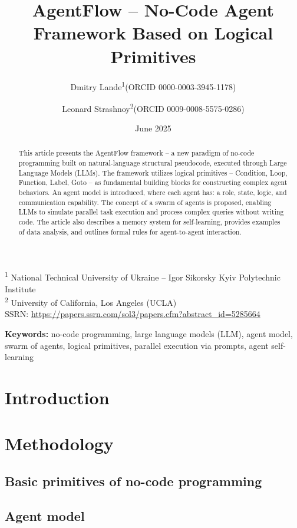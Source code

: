 \documentclass[11pt]{article}
\title{AgentFlow -- No-Code Agent Framework Based on Logical Primitives}
\author{
  Dmitry Lande\textsuperscript{1}(ORCID 0000-0003-3945-1178)
  \and
  Leonard Strashnoy\textsuperscript{2}(ORCID 0009-0008-5575-0286)
}
\date{June 2025}
\begin{document}
\maketitle

\begin{center}
{\small
\textsuperscript{1} National Technical University of Ukraine -- Igor Sikorsky Kyiv Polytechnic Institute\\
\textsuperscript{2} University of California, Los Angeles (UCLA)\\[0.5em]
SSRN: \url{https://papers.ssrn.com/sol3/papers.cfm?abstract_id=5285664}
}
\end{center}

\begin{abstract}
This article presents the AgentFlow framework -- a new paradigm of no-code
programming built on natural-language structural pseudocode, executed through Large Language
Models (LLMs). The framework utilizes logical primitives -- Condition, Loop, Function, Label,
Goto -- as fundamental building blocks for constructing complex agent behaviors. An agent
model is introduced, where each agent has: a role, state, logic, and communication capability.
The concept of a swarm of agents is proposed, enabling LLMs to simulate parallel task execution
and process complex queries without writing code. The article also describes a memory system
for self-learning, provides examples of data analysis, and outlines formal rules for agent-to-agent
interaction.
\end{abstract}

\noindent\textbf{Keywords:} no-code programming, large language models (LLM), agent model, swarm of agents,
logical primitives, parallel execution via prompts, agent self-learning

\section{Introduction}

\section{Methodology}
\subsection{Basic primitives of no-code programming}
\subsection{Agent model}
\end{document}
